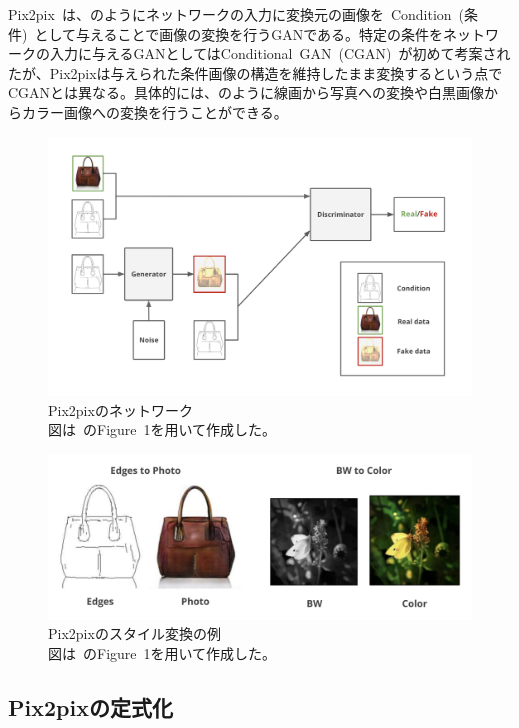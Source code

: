 Pix2pix~\cite{pix2pix}は、のようにネットワークの入力に変換元の画像を~Condition~(条件)~として与えることで画像の変換を行うGANである。特定の条件をネットワークの入力に与えるGANとしてはConditional~GAN~(CGAN)~\cite{CGAN}が初めて考案されたが、Pix2pixは与えられた条件画像の構造を維持したまま変換するという点でCGANとは異なる。具体的には、のように線画から写真への変換や白黒画像からカラー画像への変換を行うことができる。

\begin{figure}[b]
\centering
\includegraphics[width=0.9\hsize]{figure/pix2pix_net.png}
\caption[Pix2pixのネットワーク]{Pix2pixのネットワーク\\
図は~\cite{pix2pix}のFigure~1を用いて作成した。}
\label{fig:pix2pix_net}
\end{figure}

\clearpage

\begin{figure}[t]
\centering
\includegraphics[width=\hsize]{figure/pix2pix_img.png}
\caption[Pix2pixのスタイル変換の例]{Pix2pixのスタイル変換の例\\
図は~\cite{pix2pix}のFigure~1を用いて作成した。}
\label{fig:pix2pix_img}
\end{figure}

\subsection{Pix2pixの定式化}

